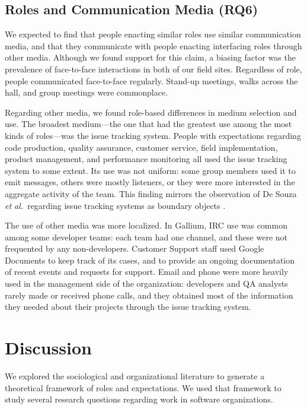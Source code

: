 \documentclass[10pt, conference, compsocconf]{IEEEtran}
\begin{document}
\subsection{Roles and Communication Media (RQ6)}

We expected to find that people enacting similar roles use similar communication media, and that they communicate with people enacting interfacing roles through other media. Although we found support for this claim, a biasing factor was the prevalence of face-to-face interactions in both of our field sites. Regardless of role, people communicated face-to-face regularly. Stand-up meetings, walks across the hall, and group meetings were commonplace.

Regarding other media, we found role-based differences in medium selection and use. The broadest medium---the one that had the greatest use among the most kinds of roles---was the issue tracking system. People with expectations regarding code production, quality assurance, customer service, field implementation, product management, and performance monitoring all used the issue tracking system to some extent. Its use was not uniform: some group members used it to emit messages, others were mostly listeners, or they were more interested in the aggregate activity of the team. This finding mirrors the observation of De Souza \emph{et al.}\ regarding issue tracking systems as boundary objects \cite{deSouza2003}.

The use of other media was more localized. In Gallium, IRC use was common among some developer teams: each team had one channel, and these were not frequented by any non-developers. Customer Support staff used Google Documents to keep track of its cases, and to provide an ongoing documentation of recent events and requests for support. Email and phone were more heavily used in the management side of the organization: developers and QA analysts rarely made or received phone calls, and they obtained most of the information they needed about their projects through the issue tracking system.




\section{Discussion}

We explored the sociological and organizational literature to generate a theoretical framework of roles and expectations. We used that framework to study several research questions regarding work in software organizations.
\end{document}
